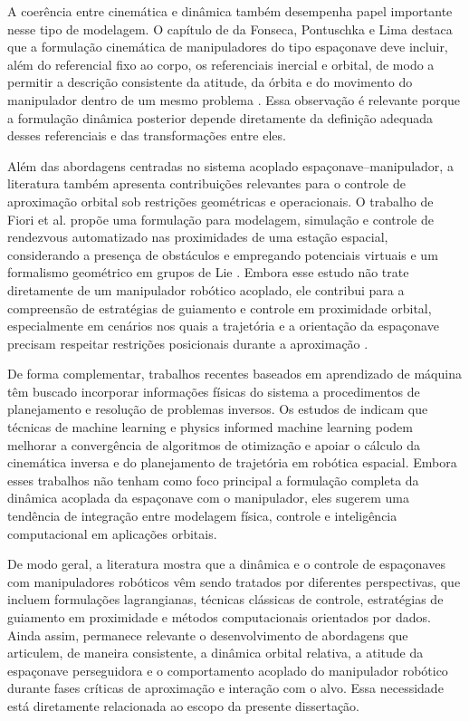 A coerência entre cinemática e dinâmica também desempenha papel importante nesse tipo de modelagem. O capítulo de da Fonseca, Pontuschka e Lima destaca que a formulação cinemática de manipuladores do tipo espaçonave deve incluir, além do referencial fixo ao corpo, os referenciais inercial e orbital, de modo a permitir a descrição consistente da atitude, da órbita e do movimento do manipulador dentro de um mesmo problema \cite{fonseca2019kinematics}. Essa observação é relevante porque a formulação dinâmica posterior depende diretamente da definição adequada desses referenciais e das transformações entre eles.

Além das abordagens centradas no sistema acoplado espaçonave--manipulador, a literatura também apresenta contribuições relevantes para o controle de aproximação orbital sob restrições geométricas e operacionais. O trabalho de Fiori et al. propõe uma formulação para modelagem, simulação e controle de rendezvous automatizado nas proximidades de uma estação espacial, considerando a presença de obstáculos e empregando potenciais virtuais e um formalismo geométrico em grupos de Lie \cite{fiori2024modeling}. Embora esse estudo não trate diretamente de um manipulador robótico acoplado, ele contribui para a compreensão de estratégias de guiamento e controle em proximidade orbital, especialmente em cenários nos quais a trajetória e a orientação da espaçonave precisam respeitar restrições posicionais durante a aproximação \cite{fiori2024modeling}.

De forma complementar, trabalhos recentes baseados em aprendizado de máquina têm buscado incorporar informações físicas do sistema a procedimentos de planejamento e resolução de problemas inversos. Os estudos de \cite{santos2022machine,santos2023physics,santos2022uncertainty} indicam que técnicas de machine learning e physics informed machine learning podem melhorar a convergência de algoritmos de otimização e apoiar o cálculo da cinemática inversa e do planejamento de trajetória em robótica espacial. Embora esses trabalhos não tenham como foco principal a formulação completa da dinâmica acoplada da espaçonave com o manipulador, eles sugerem uma tendência de integração entre modelagem física, controle e inteligência computacional em aplicações orbitais.

De modo geral, a literatura mostra que a dinâmica e o controle de espaçonaves com manipuladores robóticos vêm sendo tratados por diferentes perspectivas, que incluem formulações lagrangianas, técnicas clássicas de controle, estratégias de guiamento em proximidade e métodos computacionais orientados por dados. Ainda assim, permanece relevante o desenvolvimento de abordagens que articulem, de maneira consistente, a dinâmica orbital relativa, a atitude da espaçonave perseguidora e o comportamento acoplado do manipulador robótico durante fases críticas de aproximação e interação com o alvo. Essa necessidade está diretamente relacionada ao escopo da presente dissertação.